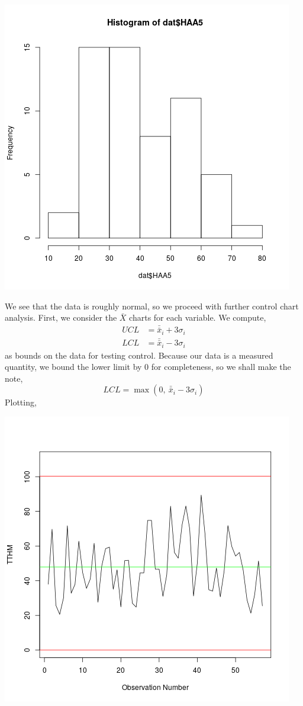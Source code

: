 \documentclass[letterpaper,10pt]{article}
\begin{document}
\begin{enumerate}
\begin{center}
\includegraphics[scale=.5]{hhist.png}
\end{center}
We see that the data is roughly normal, so we proceed with further control chart analysis. First, we consider the $\bar{X}$ charts for each variable. We compute,
\begin{align*}
UCL &= \bar{\bar{x}}_i+3\sigma_i\\
LCL &= \bar{\bar{x}}_i-3\sigma_i
\end{align*}
as bounds on the data for testing control. Because our data is a measured quantity, we bound the lower limit by 0 for completeness, so we shall make the note,
\[LCL=\max(0,\ \bar{\bar{x}}_i-3\sigma_i)\]
Plotting,
\begin{center}
\includegraphics[scale=.5]{tthmxbar.png}

\end{center}
\end{enumerate}
\end{document}
